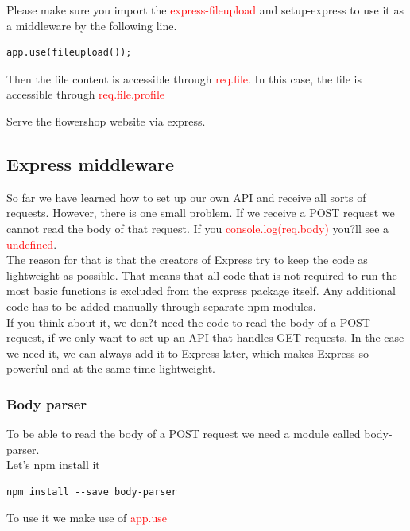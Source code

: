 \documentclass[a4paper]{article}
\begin{document}
Please make sure you import the \textcolor{red}{express-fileupload} and setup-express to use it as a middleware by the following line.
\begin{lstlisting}
app.use(fileupload());
\end{lstlisting}
Then the file content is accessible through \textcolor{red}{req.file}. In this case, the file is accessible through \textcolor{red}{req.file.profile}

\begin{eg}
Serve the flowershop website via express.
\end{eg}

\subsection{Express middleware}
So far we have learned how to set up our own API and receive all sorts of requests. However, there is one small problem. If we receive a POST request we cannot read the body of that request. If you \textcolor{red}{console.log(req.body)} you?ll see a \textcolor{red}{undefined}.\\

The reason for that is that the creators of Express try to keep the code as lightweight as possible. That means that all code that is not required to run the most basic functions is excluded from the express package itself. Any additional code has to be added manually through separate npm modules.\\

If you think about it, we don?t need the code to read the body of a POST request, if we only want to set up an API that handles GET requests. In the case we need it, we can always add it to Express later, which makes Express so powerful and at the same time lightweight.
\subsubsection{Body parser}
To be able to read the body of a POST request we need a module called body-parser.\\

Let's npm install it

\begin{lstlisting}
npm install --save body-parser
\end{lstlisting}

To use it we make use of \textcolor{red}{app.use}
\end{document}
